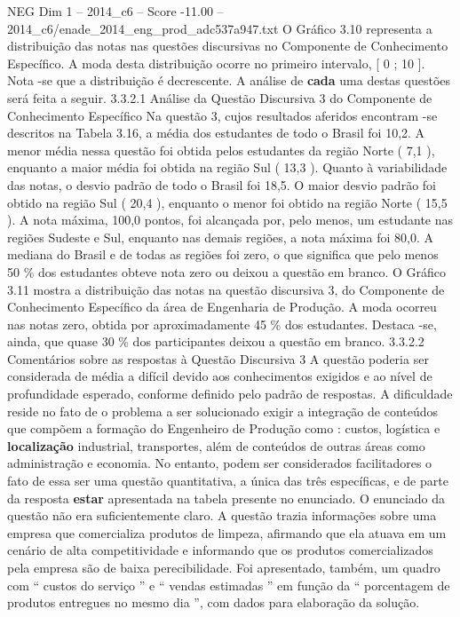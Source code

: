 \begin{textsample}{NEG Dim 1 – 2014\_c6 – Score -11.00 – 2014\_c6/enade\_2014\_eng\_prod\_adc537a947.txt}
O Gráfico 3.10 representa a distribuição das notas nas questões discursivas no Componente de Conhecimento Específico.
A moda desta distribuição ocorre no primeiro intervalo, [ 0 ; 10 ].
Nota -se que a distribuição é decrescente.
A análise de \textbf{cada} uma destas questões será feita a seguir. 3.3.2.1 Análise da Questão Discursiva 3 do Componente de Conhecimento Específico Na questão 3, cujos resultados aferidos encontram -se descritos na Tabela 3.16, a média dos estudantes de todo o Brasil foi 10,2.
A menor média nessa questão foi obtida pelos estudantes da região Norte ( 7,1 ), enquanto a maior média foi obtida na região Sul ( 13,3 ).
Quanto à variabilidade das notas, o desvio padrão de todo o Brasil foi 18,5.
O maior desvio padrão foi obtido na região Sul ( 20,4 ), enquanto o menor foi obtido na região Norte ( 15,5 ).
A nota máxima, 100,0 pontos, foi alcançada por, pelo menos, um estudante nas regiões Sudeste e Sul, enquanto nas demais regiões, a nota máxima foi 80,0.
A mediana do Brasil e de todas as regiões foi zero, o que significa que pelo menos 50 \% dos estudantes obteve nota zero ou deixou a questão em branco.
O Gráfico 3.11 mostra a distribuição das notas na questão discursiva 3, do Componente de Conhecimento Específico da área de Engenharia de Produção.
A moda ocorreu nas notas zero, obtida por aproximadamente 45 \% dos estudantes.
Destaca -se, ainda, que quase 30 \% dos participantes deixou a questão em branco. 3.3.2.2 Comentários sobre as respostas à Questão Discursiva 3 A questão poderia ser considerada de média a difícil devido aos conhecimentos exigidos e ao nível de profundidade esperado, conforme definido pelo padrão de respostas.
A dificuldade reside no fato de o problema a ser solucionado exigir a integração de conteúdos que compõem a formação do Engenheiro de Produção como : custos, logística e \textbf{localização} industrial, transportes, além de conteúdos de outras áreas como administração e economia.
No entanto, podem ser considerados facilitadores o fato de essa ser uma questão quantitativa, a única das três específicas, e de parte da resposta \textbf{estar} apresentada na tabela presente no enunciado.
O enunciado da questão não era suficientemente claro.
A questão trazia informações sobre uma empresa que comercializa produtos de limpeza, afirmando que ela atuava em um cenário de alta competitividade e informando que os produtos comercializados pela empresa são de baixa perecibilidade.
Foi apresentado, também, um quadro com “ custos do serviço ” e “ vendas estimadas ” em função da “ porcentagem de produtos entregues no mesmo dia ”, com dados para elaboração da solução.

\end{textsample}
